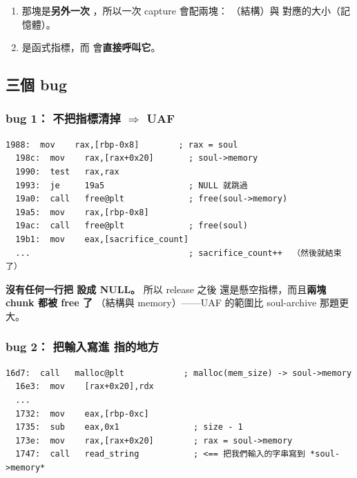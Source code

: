 \begin{keybox}[記住兩件事]
\begin{enumerate}[leftmargin=1.4em,itemsep=1pt]
  \item {} 那塊是\textbf{另外一次 }，所以一次 capture 會配兩塊：
        （結構）與  對應的大小（記憶體）。
  \item {} 是函式指標，而  會\textbf{直接呼叫它}。
\end{enumerate}
\end{keybox}

\subsection{三個 bug}

\subsubsection{bug 1： 不把指標清掉 $\Rightarrow$ UAF}

\begin{lstlisting}[style=asm]
  1988:  mov    rax,[rbp-0x8]        ; rax = soul
  198c:  mov    rax,[rax+0x20]       ; soul->memory
  1990:  test   rax,rax
  1993:  je     19a5                 ; NULL 就跳過
  19a0:  call   free@plt             ; free(soul->memory)
  19a5:  mov    rax,[rbp-0x8]
  19ac:  call   free@plt             ; free(soul)
  19b1:  mov    eax,[sacrifice_count]
  ...                                ; sacrifice_count++  （然後就結束了）
\end{lstlisting}

\textbf{沒有任何一行把  設成 NULL。}
所以 release 之後  還是懸空指標，而且\textbf{兩塊 chunk 都被 free 了}
（結構與 memory）——UAF 的範圍比 soul-archive 那題更大。

\subsubsection{bug 2： 把輸入寫進  指的地方}

\begin{lstlisting}[style=asm]
  16d7:  call   malloc@plt            ; malloc(mem_size) -> soul->memory
  16e3:  mov    [rax+0x20],rdx
  ...
  1732:  mov    eax,[rbp-0xc]
  1735:  sub    eax,0x1               ; size - 1
  173e:  mov    rax,[rax+0x20]        ; rax = soul->memory
  1747:  call   read_string           ; <== 把我們輸入的字串寫到 *soul->memory*
\end{lstlisting}

